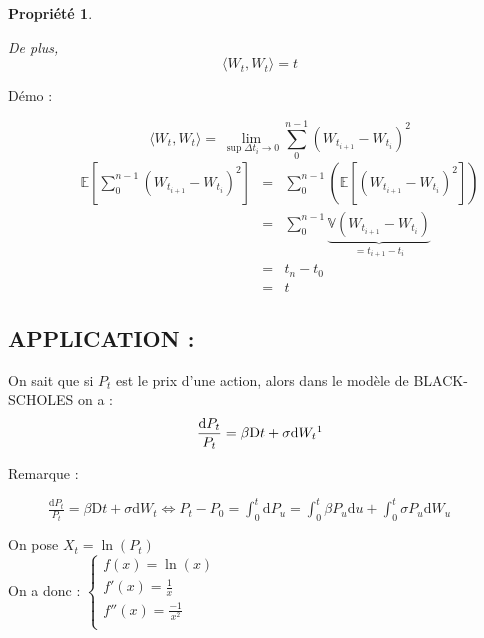 \documentclass{report}
\newtheorem{prop}{Propri\'et\'e}
\newenvironment{encadre}{%
  \setlength{\theorempreskipamount}{0pt}%
  \setlength{\theorempostskipamount}{0pt}%
  \begin{framed}%
 }{%
  \vspace{-2pt}%
  \end{framed}%
 }
\begin{document}
\begin{encadre}
\begin{prop}$\ $

De plus, \[\langle W_t, W_t\rangle = t\]
\begin{description}
    \item [Démo : ] \[\langle W_t,W_t\rangle = \displaystyle\lim_{\sup \Delta t_i\to 0}\displaystyle
    \sum_0^{n-1}(W_{t_{i+1}}-W_{t_i})^2\] 
    \begin{eqnarray}
    \mathbb{E}\left[\displaystyle\sum^{n-1}_0(W_{t_{i+1}}-W_{t_i})^2\right]&=&\displaystyle\sum^{n-1}_0\left(\mathbb{E}\left[(W_{t_{i+1}}-W_{t_i})^2\right]\right)\nonumber\\
    &=&\displaystyle\sum^{n-1}_0 \underbrace{\mathbb{V}(W_{t_{i+1}}-W_{t_i})}_{=t_{i+1}-t_i}\nonumber\\
    &=& t_n-t_0\nonumber\\
    &=&t\nonumber
    \end{eqnarray}
\end{description}
\end{prop}
\end{encadre}


\vspace{0.4cm}

\subsection{APPLICATION :}
   
   On sait que si $P_t$ est le prix d'une action, alors dans le modèle de BLACK-SCHOLES on a : \[\displaystyle\frac{\mathrm{d}P_t}{P_t}=\beta\mathrm{D}t+\sigma\mathrm{d}W_t\footnotemark\]

\begin{description}
    \item [Remarque : ] $\displaystyle\frac{\mathrm{d}P_t}{P_t}=\beta\mathrm{D}t+\sigma\mathrm{d}W_t \Leftrightarrow P_t-P_0=\displaystyle\int^t_0\mathrm{d}P_u=\displaystyle\int_0^t\beta P_u\mathrm{d}u+\int^t_0\sigma P_u\mathrm{d}W_u$
\end{description}
 

   On pose $X_t=\ln(P_t)$\\
   On a donc : $\left\{\begin{array}{ll} 
    f(x)=\ln(x)\\ 
    f'(x)=\displaystyle\frac{1}{x} \\ 
    f''(x)=\displaystyle\frac{-1}{x^2}\\
\end{array} \right.$
\end{document}
